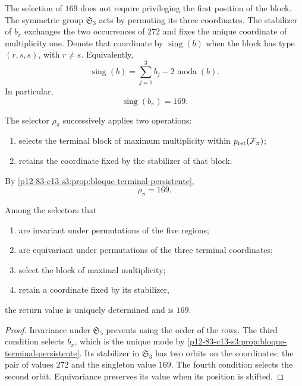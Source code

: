 The selection of \(169\) does not require privileging the first position of the block. The symmetric group \(\mathfrak S_3\) acts by permuting its three coordinates. The stabilizer of \(b_\pi\) exchanges the two occurrences of \(272\) and fixes the unique coordinate of multiplicity one. Denote that coordinate by \(\operatorname{sing}(b)\) when the block has type \((r,s,s)\), with \(r\ne s\). Equivalently,
\[
\operatorname{sing}(b)
=\sum_{j=1}^3b_j-2\operatorname{moda}(b).
\]
In particular,
\[
\boxed{\operatorname{sing}(b_\pi)=169.}
\]

\begin{definition}
\label{p12-83-c13-s3:def:selector-residual-pi}
The selector \(\rho_\pi\) successively applies two operations:
\begin{enumerate}
  \item selects the terminal block of maximum multiplicity within
  \(p_{\rm ret}(\mathcal F_\pi)\);
  \item retains the coordinate fixed by the stabilizer of that block.
\end{enumerate}
By \cref{p12-83-c13-s3:prop:bloque-terminal-persistente},
\[
\boxed{\rho_\pi=169.}
\]
\end{definition}

\begin{theorem}
\label{p12-83-c13-s3:thm:unicidad-retorno-169}
Among the selectors that
\begin{enumerate}
  \item are invariant under permutations of the five regions;
  \item are equivariant under permutations of the three terminal
  coordinates;
  \item select the block of maximal multiplicity;
  \item retain a coordinate fixed by its stabilizer,
\end{enumerate}
the return value is uniquely determined and is \(169\).
\end{theorem}

\begin{proof}
Invariance under \(\mathfrak S_5\) prevents using the order of the rows. The
third condition selects \(b_\pi\), which is the unique mode by
\cref{p12-83-c13-s3:prop:bloque-terminal-persistente}. Its stabilizer in
\(\mathfrak S_3\) has two orbits on the coordinates: the pair of
values \(272\) and the singleton value \(169\). The fourth condition selects the
second orbit. Equivariance preserves its value when its position is shifted.
\end{proof}

